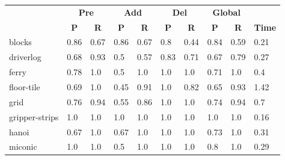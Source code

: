 \begin{table}[hbt!]
		\begin{center}
			
			\begin{tabular}{l|l|l|l|l|l|l||l|l|l|}
				& \multicolumn{2}{|c|}{\bf Pre} & \multicolumn{2}{|c|}{\bf Add} & \multicolumn{2}{|c||}{\bf Del} & \multicolumn{2}{|c|}{\bf Global} & \\ \cline{2-9}			
				& \multicolumn{1}{|c|}{\bf P} & \multicolumn{1}{|c|}{\bf R} & \multicolumn{1}{|c|}{\bf P} & \multicolumn{1}{|c|}{\bf R} & \multicolumn{1}{|c|}{\bf P} & \multicolumn{1}{|c||}{\bf R} &  \multicolumn{1}{|c|}{\bf P} & \multicolumn{1}{|c|}{\bf R} & {\bf Time} \\
				\hline
				blocks & 0.86 & 0.67 & 0.86 & 0.67 & 0.8 & 0.44 & 0.84 & 0.59& 0.21 \\ %
				driverlog & 0.68 & 0.93 & 0.5 & 0.57 & 0.83 & 0.71 & 0.67 & 0.79& 0.27 \\ %
				ferry & 0.78 & 1.0 & 0.5 & 1.0 & 1.0 & 1.0 & 0.71 & 1.0& 0.4 \\ %
				floor-tile & 0.69 & 1.0 & 0.45 & 0.91 & 1.0 & 0.82 & 0.65 & 0.93& 1.42 \\ %
				grid & 0.76 & 0.94 & 0.55 & 0.86 & 1.0 & 1.0 & 0.74 & 0.94& 0.7 \\ %
				gripper-strips & 1.0 & 1.0 & 1.0 & 1.0 & 1.0 & 1.0 & 1.0 & 1.0& 0.16 \\ %
				hanoi & 0.67 & 1.0 & 0.67 & 1.0 & 1.0 & 1.0 & 0.73 & 1.0& 0.31 \\ %
				miconic & 1.0 & 1.0 & 0.5 & 1.0 & 1.0 & 1.0 & 0.8 & 1.0& 0.29 \\ %

\end{tabular}
\end{center}
\end{table}
